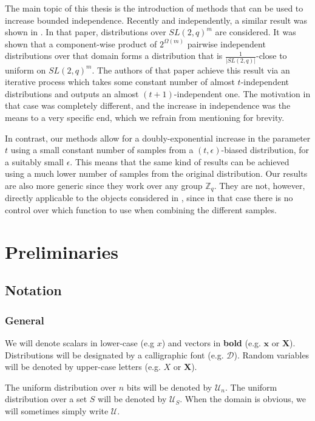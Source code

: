 \documentclass[12pt]{article}
\newcommand{\dist}{\mathcal{D}}
\newcommand{\Z}{\mathbb{Z}}
\newcommand{\abs}[1]{\left| #1 \right|}
\renewcommand{\vec}[1]{\bm{#1}}
\begin{document}
	The main topic of this thesis is the introduction of methods that can be used to increase bounded independence.
	Recently and independently, a similar result was shown in \cite{Gowers}.
	In that paper, distributions over $SL(2,q)^m$ are considered.
	It was shown that a component-wise product of $2^{\Omega(m)}$ pairwise independent distributions over that domain forms a distribution that is $\frac{1}{\abs{SL(2,q)}}$-close to uniform on $SL(2,q)^m$.
	The authors of that paper achieve this result via an iterative process which takes some constant number of almost $t$-independent distributions and outputs an almost $(t+1)$-independent one.
	The motivation in that case was completely different, and the increase in independence was the means to a very specific end, which we refrain from mentioning for brevity.
	
	In contrast, our methods allow for a doubly-exponential increase in the parameter $t$ using a small constant number of  samples from a $(t, \epsilon)$-biased distribution, for a suitably small $\epsilon$.
	This means that the same kind of results can be achieved using a much lower number of samples from the original distribution. Our results are also more generic since they work over any group $\Z_q$.
	They are not, however, directly applicable to the objects considered in \cite{Gowers}, since in that case there is no control over which function to use when combining the different samples.

\section{Preliminaries}
	
	\subsection{Notation}
	
	\subsubsection{General}
	
	We will denote scalars in lower-case (e.g $x$) and vectors in \textbf{bold} (e.g. $\vec{x}$ or $\vec{X}$).
	Distributions will be designated by a calligraphic font (e.g. $\dist$).
	Random variables will be denoted by upper-case letters (e.g. $X$ or $\vec{X}$).
	
	The uniform distribution over $n$ bits will be denoted by $\mathcal{U}_n$.
	The uniform distribution over a set $S$ will be denoted by $\mathcal{U}_S$.
	When the domain is obvious, we will sometimes simply write $\mathcal{U}$.
	
\end{document}
